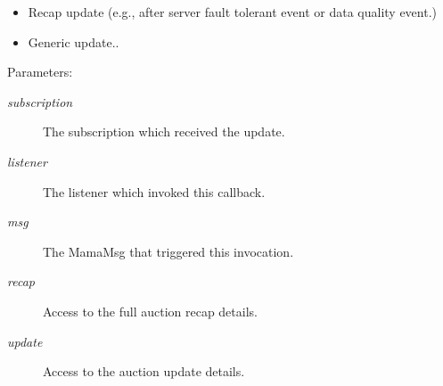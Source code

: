 \begin{itemize}
\item Recap update (e.g., after server fault tolerant event or data quality event.)\item Generic update..\end{itemize}


\begin{Desc}
\item[Parameters:]
\begin{description}
\item[{\em subscription}]The subscription which received the update. \item[{\em listener}]The listener which invoked this callback. \item[{\em msg}]The Mama\-Msg that triggered this invocation. \item[{\em recap}]Access to the full auction recap details. \item[{\em update}]Access to the auction update details. \end{description}
\end{Desc}
